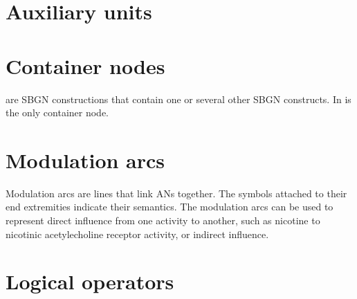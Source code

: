 \section{Auxiliary units}\label{sec:af:AUs}




\section{Container nodes}
\label{sec:af:CNs}

 are SBGN constructions that contain one or several other SBGN constructs.  In \SBGNAFLone {} is the only container node.






\section{Modulation arcs}\label{sec:af:arcs}

Modulation arcs are lines that link ANs together.  The symbols attached to their end extremities indicate their semantics.  The modulation arcs can be used to represent direct influence from one activity to another, such as nicotine to nicotinic acetylecholine receptor activity, or indirect influence.











\section{Logical operators}\label{sec:af:logic}




 
